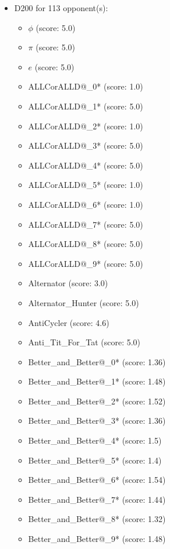 \begin{appendices}
\begin{itemize}
    \item D200 for 113 opponent(s):
    \begin{multicols}{3}
         \begin{itemize}
            \item $\phi$ (score: 5.0)
            \item $\pi$ (score: 5.0)
            \item $e$ (score: 5.0)
            \item ALLCorALLD@\_0* (score: 1.0)
            \item ALLCorALLD@\_1* (score: 5.0)
            \item ALLCorALLD@\_2* (score: 1.0)
            \item ALLCorALLD@\_3* (score: 5.0)
            \item ALLCorALLD@\_4* (score: 5.0)
            \item ALLCorALLD@\_5* (score: 1.0)
            \item ALLCorALLD@\_6* (score: 1.0)
            \item ALLCorALLD@\_7* (score: 5.0)
            \item ALLCorALLD@\_8* (score: 5.0)
            \item ALLCorALLD@\_9* (score: 5.0)
            \item Alternator (score: 3.0)
            \item Alternator\_Hunter (score: 5.0)
            \item AntiCycler (score: 4.6)
            \item Anti\_Tit\_For\_Tat (score: 5.0)
            \item Better\_and\_Better@\_0* (score: 1.36)
            \item Better\_and\_Better@\_1* (score: 1.48)
            \item Better\_and\_Better@\_2* (score: 1.52)
            \item Better\_and\_Better@\_3* (score: 1.36)
            \item Better\_and\_Better@\_4* (score: 1.5)
            \item Better\_and\_Better@\_5* (score: 1.4)
            \item Better\_and\_Better@\_6* (score: 1.54)
            \item Better\_and\_Better@\_7* (score: 1.44)
            \item Better\_and\_Better@\_8* (score: 1.32)
            \item Better\_and\_Better@\_9* (score: 1.48)

\end{itemize}
\end{multicols}
\end{itemize}
\end{appendices}
